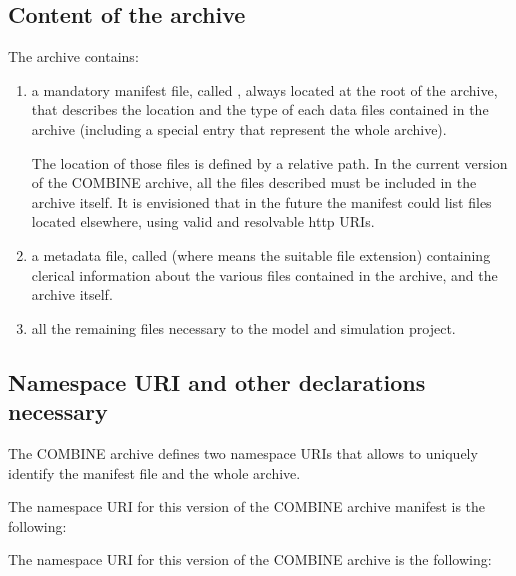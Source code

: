 \subsection{Content of the archive}

The archive contains: 

\begin{enumerate}
	\item {
	
     a mandatory manifest file, called , always located at the 
     root of the archive, that describes the location and the type of each 
     data files contained in the archive (including a special entry that represent
     the whole archive).
     
     The location of those files is defined by a relative path. In the current 
     version of the COMBINE archive, all the files described must be included 
     in the archive itself. It is envisioned that in the future the manifest 
     could list files located elsewhere, using valid and resolvable http 
     URIs. 

	}
	\item {
     a metadata file, called  (where \token{*} means the 
     suitable file extension) containing clerical information about the 
     various files contained in the archive, and the archive itself. 
	}
	\item {all the remaining files necessary to the model and simulation project. }

\end{enumerate}

\subsection{Namespace URI and other declarations necessary}
\label{xml-namespace}

The COMBINE archive defines two namespace URIs that allows to uniquely 
identify the manifest file and the whole archive.

The namespace URI for this version of the COMBINE archive manifest is the following: 

\begin{center}
\end{center}

The namespace URI for this version of the COMBINE archive is the following: 

\begin{center}
\end{center}




